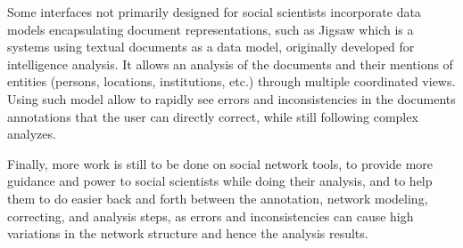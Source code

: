 Some interfaces not primarily designed for social scientists incorporate data models encapsulating document representations, such as Jigsaw \cite{staskoJigsawSupportingInvestigative2008} which is a \va systems using textual documents as a data model, originally developed for intelligence analysis.
It allows an analysis of the documents and their mentions of entities (persons, locations, institutions, etc.) through multiple coordinated views.
Using such model allow to rapidly see errors and inconsistencies in the documents annotations that the user can directly correct, while still following complex analyzes.

Finally, more work is still to be done on social network \va tools, to provide more guidance and power to social scientists while doing their analysis, and to help them to do easier back and forth between the annotation, network modeling, correcting, and analysis steps, as errors and inconsistencies can cause high variations in the network structure and hence the analysis results\cite{diesnerImpactEntityDisambiguation2015}.









%







